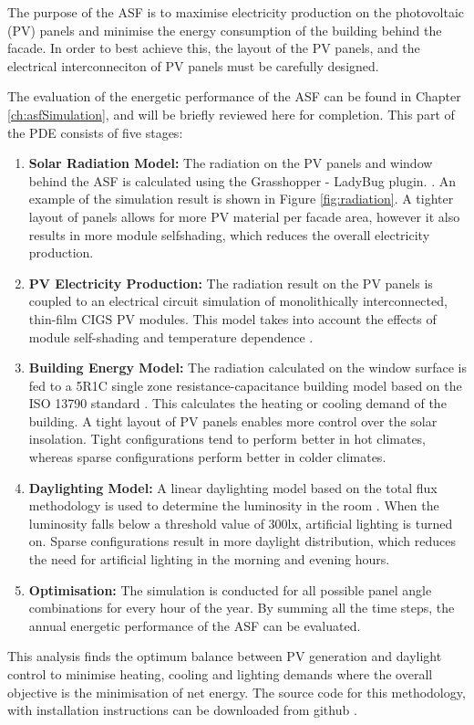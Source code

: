 The purpose of the ASF is to maximise electricity production on the photovoltaic (PV) panels and minimise the energy consumption of the building behind the facade. In order to best achieve this, the layout of the PV panels, and the electrical interconneciton of PV panels must be carefully designed.

The evaluation of the energetic performance of the ASF can be found in Chapter \ref{ch:asfSimulation}, and will be briefly reviewed here for completion. This part of the PDE consists of five stages: 

\begin{enumerate}
\item \textbf{Solar Radiation Model:} The radiation on the PV panels and window behind the ASF is calculated using the Grasshopper - LadyBug plugin.  \cite{roudsari2013ladybug}. An example of the simulation result is shown in Figure \ref{fig:radiation}. A tighter layout of panels allows for more PV material per facade area, however it also results in more module selfshading, which reduces the overall electricity production.
\item \textbf{PV Electricity Production:} The radiation result on the PV panels is coupled to an electrical circuit simulation of monolithically interconnected, thin-film CIGS PV modules. This model takes into account the effects of module self-shading and temperature dependence \cite{hofer2016parametric}. 
\item \textbf{Building Energy Model:} The radiation calculated on the window surface is fed to a 5R1C single zone resistance-capacitance building model based on the ISO 13790 standard \cite{de2008iso}. This calculates the heating or cooling demand of the building. A tight layout of PV panels enables more control over the solar insolation. Tight configurations tend to perform better in hot climates, whereas sparse configurations perform better in colder climates. 
\item \textbf{Daylighting Model:} A linear daylighting model based on the total flux methodology is used to determine the luminosity in the room \cite{szokolay1980handbook}. When the luminosity falls below a threshold value of 300lx, artificial lighting is turned on. Sparse configurations result in more daylight distribution, which reduces the need for artificial lighting in the morning and evening hours.
\item \textbf{Optimisation:} The simulation is conducted for all possible panel angle combinations for every hour of the year. By summing all the time steps, the annual energetic performance of the ASF can be evaluated. 
\end{enumerate}
This analysis finds the optimum balance between PV generation and daylight control to minimise heating, cooling and lighting demands where the overall objective is the minimisation of net energy.
The source code for this methodology, with installation instructions can be downloaded from github \cite{ASFGitHub,RCGitHub}.

